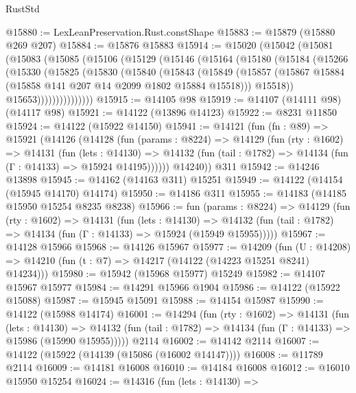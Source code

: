 \begin{lexlean}{RustStd}
\begin{coremodule}
@15880 := LexLeanPreservation.Rust.constShape
@15883 := @15879 (@15880 @269 @207)
@15884 := @15876 @15883
@15914 := @15020
    (@15042
      (@15081
        (@15083
          (@15085
            (@15106
              (@15129
                (@15146
                  (@15164
                    (@15180
                      (@15184
                        (@15266
                          (@15330
                            (@15825
                              (@15830
                                (@15840
                                  (@15843
                                    (@15849
                                      (@15857
                                        (@15867
                                          @15884
                                          (@15858 @141 @207 @14 @2099 @1802 @15884 @15518)))
                                      @15518))
                                  @15653)))))))))))))))
@15915 := @14105 @98
@15919 := @14107 (@14111 @98) (@14117 @98)
@15921 := @14122 (@13896 @14123)
@15922 := @8231 @11850
@15924 := @14122 (@15922 @14150)
@15941 := @14121
    (fun (fn : @89) =>
    @15921
      (@14126
        (@14128
          (fun (params : @8224) =>
          @14129
            (fun (rty : @1602) =>
            @14131
              (fun (lets : @14130) =>
              @14132 (fun (tail : @1782) => @14134 (fun (Γ : @14133) => @15924 @14195))))))
        @14240))
    @311
@15942 := @14246 @13898
@15945 := @14162 (@14163 @311) @15251
@15949 := @14122 (@14154 (@15945 @14170) @14174)
@15950 := @14186 @311
@15955 := @14183 (@14185 @15950 @15254 @8235 @8238)
@15966 := fun (params : @8224) =>
  @14129
    (fun (rty : @1602) =>
    @14131
      (fun (lets : @14130) =>
      @14132 (fun (tail : @1782) => @14134 (fun (Γ : @14133) => @15924 (@15949 @15955)))))
@15967 := @14128 @15966
@15968 := @14126 @15967
@15977 := @14209
    (fun (U : @14208) => @14210 (fun (t : @7) => @14217 (@14122 (@14223 @15251 @8241) @14234)))
@15980 := @15942 (@15968 @15977) @15249
@15982 := @14107 @15967 @15977
@15984 := @14291 @15966 @1904
@15986 := @14122 (@15922 @15088)
@15987 := @15945 @15091
@15988 := @14154 @15987
@15990 := @14122 (@15988 @14174)
@16001 := @14294
    (fun (rty : @1602) =>
    @14131
      (fun (lets : @14130) =>
      @14132 (fun (tail : @1782) => @14134 (fun (Γ : @14133) => @15986 (@15990 @15955)))))
    @2114
@16002 := @14142 @2114
@16007 := @14122 (@15922 (@14139 (@15086 (@16002 @14147))))
@16008 := @11789 @2114
@16009 := @14181 @16008
@16010 := @14184 @16008
@16012 := @16010 @15950 @15254
@16024 := @14316
    (fun (lets : @14130) =>

\end{coremodule}
\end{lexlean}
